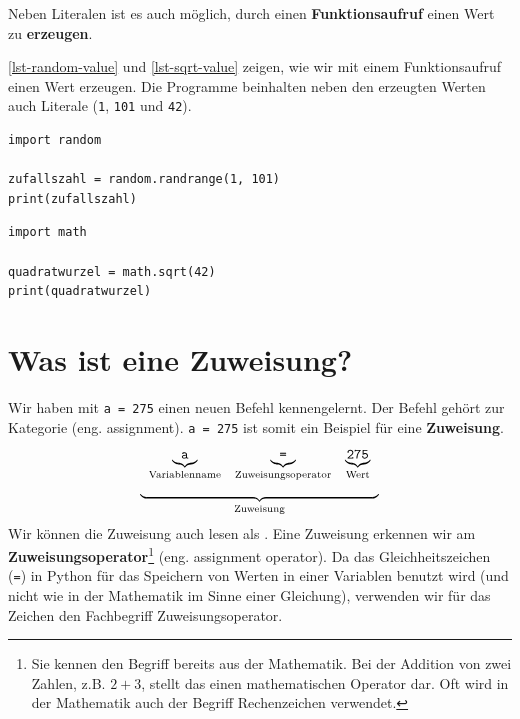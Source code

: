 Neben Literalen ist es auch möglich, durch einen \textbf{Funktionsaufruf} einen Wert zu \textbf{erzeugen}.

\begin{example}

\autoref{lst-random-value} und \autoref{lst-sqrt-value} zeigen, wie wir mit einem Funktionsaufruf einen Wert erzeugen. Die Programme beinhalten neben den erzeugten Werten auch Literale (\lstinline{1}, \lstinline{101} und \lstinline{42}). 

\begin{lstlisting}[caption={Erzeugt eine Zufallszahl zwischen $1$ und $100$ und gibt diese dann in der Konsole aus.}, label={lst-random-value}]
import random

zufallszahl = random.randrange(1, 101)
print(zufallszahl)
\end{lstlisting}
	
\begin{lstlisting}[caption={Berechnet die Quadratwurzel aus $42$ und gibt diese dann in der Konsole aus.}, label={lst-sqrt-value}]
import math

quadratwurzel = math.sqrt(42)
print(quadratwurzel)
	\end{lstlisting}
\end{example}

\section{Was ist eine Zuweisung?}

Wir haben mit \lstinline{a = 275} einen neuen Befehl kennengelernt. Der Befehl gehört zur Kategorie  (eng. assignment). \lstinline{a = 275} ist somit ein Beispiel für eine \textbf{Zuweisung}.
$$
\begin{array}[t]{c}
\begin{array}[t]{ccc} 
\underbrace{\textrm{\texttt{a}}}_{\textrm{Variablenname}} & \underbrace{\textrm{\texttt{=}}}_{\textrm{Zuweisungsoperator}} & \underbrace{\textrm{\texttt{275}}}_{\textrm{Wert}}
\end{array} \\
\underbrace{\hspace{6cm}}_{\textrm{Zuweisung}}
\end{array}
$$
Wir können die Zuweisung auch lesen als . Eine Zuweisung erkennen wir am \textbf{Zuweisungsoperator}\footnote{Sie kennen den Begriff bereits aus der Mathematik. Bei der Addition von zwei Zahlen, z.B. $2 + 3$, stellt das  einen mathematischen Operator dar. Oft wird in der Mathematik auch der Begriff Rechenzeichen verwendet.} (eng. assignment operator). Da das Gleichheitszeichen (\lstinline{=}) in Python für das Speichern von Werten in einer Variablen benutzt wird (und nicht wie in der Mathematik im Sinne einer Gleichung), verwenden wir für das Zeichen den Fachbegriff Zuweisungsoperator.

